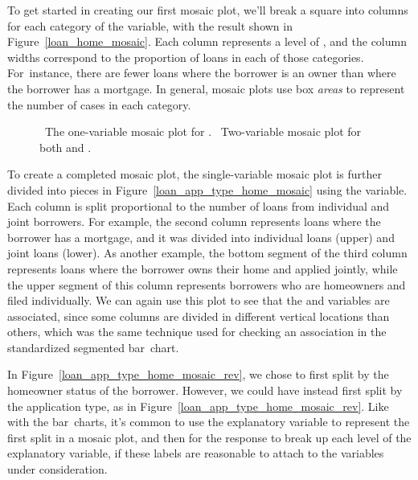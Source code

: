 To get started in creating our first mosaic plot,
we'll break a square into columns for each category
of the  variable,
with the result shown in Figure~\ref{loan_home_mosaic}.
Each column represents a level of ,
and the column widths correspond to the proportion of
loans in each of those categories.
For~instance, there are fewer loans where the borrower
is an owner than where the borrower has a mortgage.
In general, mosaic plots use box \emph{areas}
to represent the number of cases in each category.

\begin{figure}[h]
  \centering
  \caption{~The one-variable mosaic
      plot for .
      ~Two-variable mosaic
      plot for both 
      and .}
  \label{loan_app_type_home_mosaic_plot}
\end{figure}

To create a completed mosaic plot, the single-variable
mosaic plot is further divided into pieces in
Figure~\ref{loan_app_type_home_mosaic} using the
 variable.
Each column is split proportional to the
number of loans from individual and joint
borrowers.
For example, the second column represents loans
where the borrower has a mortgage,
and it was divided into individual loans (upper)
and joint loans (lower).
As another example, the bottom segment of the third column
represents loans where the borrower owns their home
and applied jointly, while the upper segment
of this column represents
borrowers who are homeowners and filed individually.
We can again use this plot to see that
the  and 
variables are associated, since some columns are divided
in different vertical locations than others,
which was the same technique used for checking an
association in the standardized segmented bar~chart.

\newpage

In Figure~\ref{loan_app_type_home_mosaic_rev},
we chose to first split by the homeowner status
of the borrower.
However, we could have instead first split by
the application type, as in
Figure~\ref{loan_app_type_home_mosaic_rev}.
Like with the bar~charts, it's common to use
the explanatory variable to represent the
first split in a mosaic plot,
and then for the response to break
up each level of the explanatory variable,
if these labels are reasonable to attach to
the variables under consideration.

